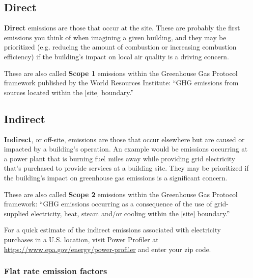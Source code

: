 \documentclass[10pt]{article}
\begin{document}
\subsection{Direct}

\textbf{Direct} emissions are those that occur at the site. These are probably the first emissions you think of when imagining a given building, and they may be prioritized {\color{blue}(e.g. reducing the amount of combustion or increasing combustion efficiency) if the building's impact on local air quality is a driving concern.}

These are also called \textbf{Scope 1} emissions within the Greenhouse Gas Protocol framework published by the World Resources Institute: ``GHG emissions from sources located within
the [site] boundary.'' \cite{ghgprotocol2014}


\subsection{Indirect}

\textbf{Indirect}, or off-site, emissions are those that occur elsewhere but are caused or impacted by a building's operation. An example would be emissions occurring at a power plant that is burning fuel miles away while providing grid electricity that's purchased to provide services at a building site. They may be prioritized if the building's impact on greenhouse gas emissions is a significant concern.

These are also called \textbf{Scope 2} emissions within the Greenhouse Gas Protocol framework: ``GHG emissions occurring as a consequence  of the use of grid-supplied electricity, heat, 
steam and/or cooling within the [site] boundary.'' \cite{ghgprotocol2014}

For a quick estimate of the indirect emissions associated with electricity purchases in a U.S. location, visit Power Profiler at \url{https://www.epa.gov/energy/power-profiler} and enter your zip code.

\subsubsection{Flat rate emission factors}
\end{document}
